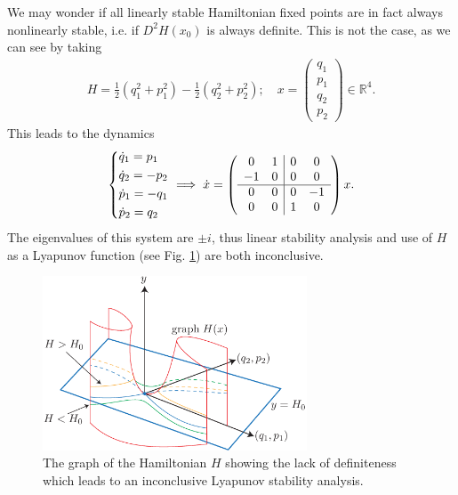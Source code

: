 We may wonder if all linearly stable Hamiltonian fixed points are in fact always nonlinearly stable, i.e. if $D^2H(x_0)$ is always definite. This is not the case, as we can see by taking
 \begin{align}
	 H = \frac{1}{2} \left(q_{1}^{2} + p_{1} ^{2}\right) - \frac{1}{2}\left( q_{2}^{2} + p_{2}^{2}\right);\quad x=
	 \begin{pmatrix}
	 	q_1 \\ p_1 \\ q_2 \\ p_2
	 \end{pmatrix}
	\in \mathbb{R}^{4}. 
\end{align}
This leads to the dynamics
\begin{align}
	\begin{dcases}
		\dot{q}_{1} = p_1 \\
		\dot{q}_2 = - p_2 \\
		\dot{p}_{1} = - q_{1} \\
		\dot{p}_{2} = q_2
	\end{dcases}
	\implies
	\dot{x}=
	\left(
	\begin{array}{ c c | c c}
		0 & 1 & 0 & 0\\
		-1 & 0 & 0 & 0 \\
		\hline
		0 & 0 & 0 & -1 \\
		0 & 0 & 1 & 0
	\end{array} 
	\right)
	x.
\end{align}
The eigenvalues of this system are $\pm i$, thus linear stability analysis and use of $H$ as a Lyapunov function (see Fig. \ref{fig:inconclusive_hamiltonian}) are both inconclusive.
\begin{figure}[h!]
	\centering
	\includegraphics[width=0.7\textwidth]{figures/ch8/18inconclusive_hamiltonian.pdf}
	\caption{The graph of the Hamiltonian $H$ showing the lack of definiteness which leads to an inconclusive Lyapunov stability analysis.}
	\label{fig:inconclusive_hamiltonian}
\end{figure}

